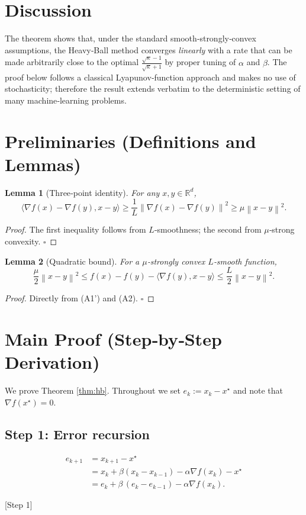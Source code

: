 \documentclass{article}
\newcommand{\R}{\mathbb{R}}
\newcommand{\norm}[1]{\left\|#1\right\|}
\newtheorem{lemma}{Lemma}
\begin{document}
\section*{Discussion}
The theorem shows that, under the standard smooth‑strongly‑convex assumptions, the Heavy‑Ball method converges \emph{linearly} with a rate that can be made arbitrarily close to the optimal $\frac{\sqrt{\kappa}-1}{\sqrt{\kappa}+1}$ by proper tuning of $\alpha$ and $\beta$.  The proof below follows a classical Lyapunov‑function approach and makes no use of stochasticity; therefore the result extends verbatim to the deterministic setting of many machine‑learning problems.

\newpage
\section*{Preliminaries (Definitions and Lemmas)}
\begin{lemma}[Three‑point identity]\label{lem:3pt}
For any $x,y\in\R^{d}$,
\[
\langle\nabla f(x)-\nabla f(y),x-y\rangle
 \ge \frac{1}{L}\norm{\nabla f(x)-\nabla f(y)}^{2}
 \ge \mu\norm{x-y}^{2}.
\]
\end{lemma}
\begin{proof}
The first inequality follows from $L$‑smoothness; the second from $\mu$‑strong convexity. \hfill $\square$
\end{proof}

\begin{lemma}[Quadratic bound]\label{lem:quad}
For a $\mu$‑strongly convex $L$‑smooth function,
\[
\frac{\mu}{2}\norm{x-y}^{2}\le f(x)-f(y)-\langle\nabla f(y),x-y\rangle\le\frac{L}{2}\norm{x-y}^{2}.
\tag{L1}
\]
\end{lemma}
\begin{proof}
Directly from (A1') and (A2). \hfill $\square$
\end{proof}

\section*{Main Proof (Step‑by‑Step Derivation)}
We prove Theorem \ref{thm:hb}.  Throughout we set $e_k:=x_k-x^\star$ and note that $\nabla f(x^\star)=0$.

\subsection*{Step 1: Error recursion}
\[
\begin{aligned}
e_{k+1}
&=x_{k+1}-x^\star\\
&=x_k+\beta(x_k-x_{k-1})-\alpha\nabla f(x_k)-x^\star\\
&=e_k+\beta\,(e_k-e_{k-1})-\alpha\nabla f(x_k).
\tag{1}
\end{aligned}
\]
\begin{center}
[Step 1]
\end{center}
\end{document}
